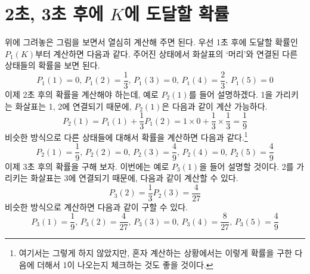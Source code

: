 \documentclass{scrartcl}
\begin{document}
\section{2초, 3초 후에 \texorpdfstring{\(K\)}{K}에 도달할 확률}
위에 그려놓은 그림을 보면서 열심히 계산해 주면 된다. 우선 1초 후에 도달할 확률인 \(P_1(K)\)부터 계산하면 다음과 같다. 주어진 상태에서 화살표의 `머리'와 연결된 다른 상태들의 확률을 보면 된다.
\[P_1(1)=0,\,P_1(2)=\frac{1}{3},\,P_1(3)=0,\,P_1(4)=\frac{2}{3},\,P_1(5)=0\]
이제 2초 후의 확률을 계산해야 하는데, 예로 \(P_2(1)\)를 들어 설명하겠다. 1을 가리키는 화살표는 1, 2에 연결되기 때문에, \(P_2(1)\)은 다음과 같이 계산 가능하다.
\[P_2(1)=P_1(1)+\frac{1}{3}P_1(2)=1\times 0+\frac{1}{3}\times\frac{1}{3}=\frac{1}{9}\]
비슷한 방식으로 다른 상태들에 대해서 확률을 계산하면 다음과 같다.\footnote{여기서는 그렇게 하지 않았지만, 혼자 계산하는 상황에서는 이렇게 확률을 구한 다음에 더해서 1이 나오는지 체크하는 것도 좋을 것이다.}
\[\boxed{P_2(1)=\frac{1}{9},\,P_2(2)=0,\,P_2(3)=\frac{4}{9},\,P_2(4)=0,\,P_2(5)=\frac{4}{9}}\]
이제 3초 후의 확률을 구해 보자. 이번에는 예로 \(P_3(1)\)을 들어 설명할 것이다. 2를 가리키는 화살표는 3에 연결되기 때문에, 다음과 같이 계산할 수 있다.
\[P_3(2)=\frac{1}{3}P_2(3)=\frac{4}{27}\]
비슷한 방식으로 계산하면 다음과 같이 구할 수 있다.
\[\boxed{P_3(1)=\frac{1}{9},\,P_3(2)=\frac{4}{27},\,P_3(3)=0,\,P_3(4)=\frac{8}{27},\,P_3(5)=\frac{4}{9}}\]
\end{document}
